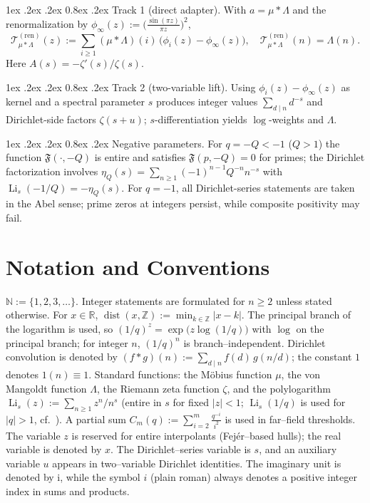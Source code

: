 \documentclass[11pt,a4paper]{amsart}
\makeatletter
\newcommand{\R}{\mathbb{R}}
\newcommand{\Z}{\mathbb{Z}}
\newcommand{\N}{\mathbb{N}}
\newcommand{\ii}{\mathrm{i}}
\renewcommand\paragraph{\@startsection{paragraph}{4}{\z@}%
  {1ex \@plus .2ex \@minus .2ex}%
  {0.8ex \@plus .2ex}%
  {\normalfont\bfseries}}
\theoremstyle{plain}
\theoremstyle{definition}
\theoremstyle{remark}
\makeatother
\begin{document}
\paragraph{Track 1 (direct adapter).}
With \(a=\mu*\Lambda\) and the renormalization by \(\phi_\infty(z):=\bigl(\tfrac{\sin(\pi z)}{\pi z}\bigr)^2\),
\[
\mathcal T^{(\mathrm{ren})}_{\mu*\Lambda}(z):=\sum_{i\ge1}(\mu*\Lambda)(i)\,\bigl(\phi_i(z)-\phi_\infty(z)\bigr),
\quad
\mathcal T^{(\mathrm{ren})}_{\mu*\Lambda}(n)=\Lambda(n).
\]
Here \(A(s)=-\zeta'(s)/\zeta(s)\).

\paragraph{Track 2 (two-variable lift).}
Using \(\phi_i(z)-\phi_\infty(z)\) as kernel and a spectral parameter \(s\) produces integer values
\(\sum_{d\mid n} d^{-s}\) and Dirichlet-side factors \(\zeta(s+u)\);
\(s\)-differentiation yields \(\log\)-weights and \(\Lambda\).

\paragraph{Negative parameters.}
For \(q=-Q<-1\) (\(Q>1\)) the function \(\mathfrak F(\cdot,-Q)\) is entire and satisfies \(\mathfrak F(p,-Q)=0\) for primes;
the Dirichlet factorization involves \(\eta_Q(s)=\sum_{n\ge1}(-1)^{n-1}Q^{-n}n^{-s}\) with \(\operatorname{Li}_s(-1/Q)=-\eta_Q(s)\).
For \(q=-1\), all Dirichlet-series statements are taken in the Abel sense; prime zeros at integers persist, while composite positivity may fail.

\medskip

\section*{Notation and Conventions}\label{app:notation}
$\N:=\{1,2,3,\dots\}$. Integer statements are formulated for $n\ge2$ unless stated otherwise. For $x\in\R$,
$\operatorname{dist}(x,\Z):=\min_{k\in\Z}|x-k|$.
The principal branch of the logarithm is used, so $(1/q)^z=\exp\bigl(z\log(1/q)\bigr)$ with $\log$ on the principal branch; for integer $n$, $(1/q)^n$ is branch–independent.
Dirichlet convolution is denoted by $(f*g)(n):=\sum_{d\mid n} f(d)\,g(n/d)$; the constant $1$ denotes $1(n)\equiv 1$.
Standard functions: the Möbius function $\mu$, the von Mangoldt function $\Lambda$, the Riemann zeta function $\zeta$, and the polylogarithm
$\operatorname{Li}_s(z):=\sum_{n\ge1} z^n/n^s$ (entire in $s$ for fixed $|z|<1$; $\operatorname{Li}_s(1/q)$ is used for $|q|>1$, cf.\ \cite{dlmf}).
A partial sum $C_m(q):=\sum_{i=2}^{m} \frac{q^{-i}}{i^2}$ is used in far–field thresholds.
The variable $z$ is reserved for entire interpolants (Fej\'er–based hulls); the real variable is denoted by $x$. The Dirichlet–series variable is $s$, and an auxiliary variable $u$ appears in two–variable Dirichlet identities. The imaginary unit is denoted by $\ii$, while the symbol $i$ (plain roman) always denotes a positive integer index in sums and products.
\end{document}
